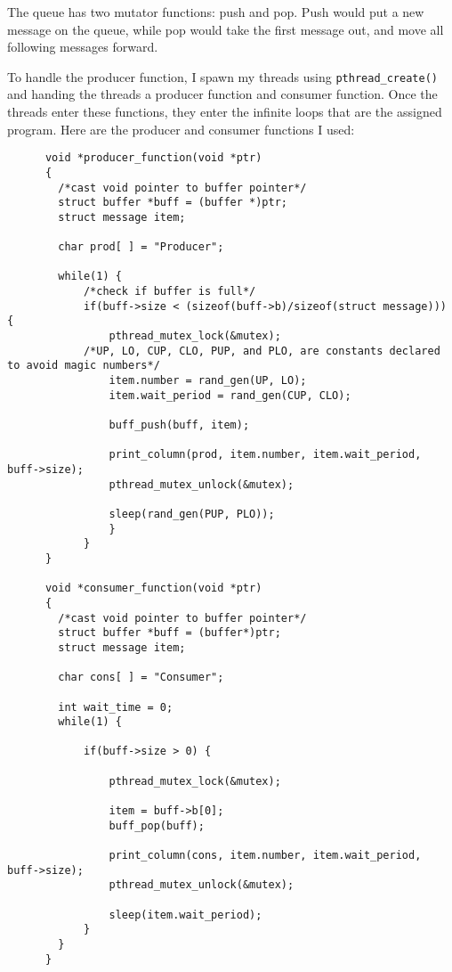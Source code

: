 \documentclass[10pt,letterpaper]{article}
\begin{document}
    \noindent The queue has two mutator functions: push and pop. Push would put
    a new message on the queue, while pop would take the first message out, and
    move all following messages forward.

    \noindent To handle the producer function, I spawn my threads using
    \texttt{pthread\_create()} and handing the threads a producer function and consumer
    function. Once the threads enter these functions, they enter the infinite
    loops that are the assigned program. Here are the producer and consumer
    functions I used:

    \begin{lstlisting}
      void *producer_function(void *ptr)
      {
      	/*cast void pointer to buffer pointer*/
      	struct buffer *buff = (buffer *)ptr;
      	struct message item;

      	char prod[ ] = "Producer";

      	while(1) {
      		/*check if buffer is full*/
      		if(buff->size < (sizeof(buff->b)/sizeof(struct message))) {
      			pthread_mutex_lock(&mutex);
            /*UP, LO, CUP, CLO, PUP, and PLO, are constants declared to avoid magic numbers*/
      			item.number = rand_gen(UP, LO);
      			item.wait_period = rand_gen(CUP, CLO);

      			buff_push(buff, item);

      			print_column(prod, item.number, item.wait_period, buff->size);
      			pthread_mutex_unlock(&mutex);

      			sleep(rand_gen(PUP, PLO));
      			}
      		}
      }

      void *consumer_function(void *ptr)
      {
      	/*cast void pointer to buffer pointer*/
      	struct buffer *buff = (buffer*)ptr;
      	struct message item;

      	char cons[ ] = "Consumer";

      	int wait_time = 0;
      	while(1) {

      		if(buff->size > 0) {

      			pthread_mutex_lock(&mutex);

      			item = buff->b[0];
      			buff_pop(buff);

      			print_column(cons, item.number, item.wait_period, buff->size);
      			pthread_mutex_unlock(&mutex);

      			sleep(item.wait_period);
      		}
      	}
      }
    \end{lstlisting}
\end{document}
